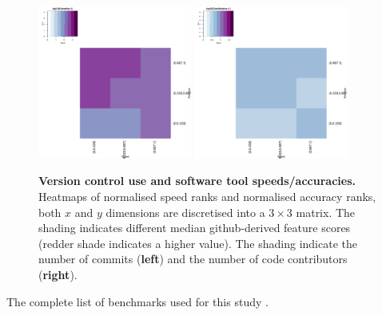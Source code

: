 \documentclass[fleqn,10pt]{SelfArx} %
\begin{document}
\begin{figure}[H]
\centering
\includegraphics[width=0.45\textwidth]{commits-SpeedVsAccuracy-heatmap.pdf}
\includegraphics[width=0.45\textwidth]{contributors-SpeedVsAccuracy-heatmap.pdf}
\caption{{\bf Version control use and software tool speeds/accuracies.}
  Heatmaps of normalised speed ranks and normalised accuracy
  ranks, both $x$ and $y$ dimensions are discretised into a $3 \times
  3$ matrix. The shading indicates different median github-derived
  feature scores (redder shade indicates a higher value).  The shading
  indicate the number of commits ({\bf left}) and the number of code contributors
  ({\bf right}).
 }
\label{fig:heatmapsCommits}
\end{figure}

The complete list of benchmarks used for this study
\cite{pmid32183840,
pmid32138645,
pmid31948481,
pmid31874603,
pmid31984131,
pmid31639029,
pmid31465436,
pmid31324872,
pmid31159850,
pmid31136576,
pmid31080946,
pmid31015787,
pmid30936559,
pmid30717772,
pmid30658573,
pmid29568413,
pmid28934964,
pmid28808243,
pmid28739658,
pmid28569140,
pmid28052134,
pmid27256311,
pmid26862001,
pmid26778510,
pmid26628557,
pmid26220471,
pmid25777524,
pmid25760244,
pmid25574120,
pmid25521762,
pmid25511303,
pmid25198770,
pmid24839440,
pmid24708189,
pmid24602402,
pmid24526711,
pmid24086547,
pmid23842808,
pmid23758764,
pmid23593445,
pmid23393030,
pmid22574964,
pmid22506536,
pmid22492192,
pmid22287634,
pmid22152123,
pmid22172045,
pmid22132132,
pmid21856737,
pmid21615913,
pmid21525877,
pmid21483869,
pmid21423806,
pmid21113338,
pmid20617200,
pmid20047664,
pmid19179695,
pmid19126200,
pmid19046431,
pmid18793413,
pmid18287116,
pmid17151342,
pmid17062146,
pmid15840834,
pmid15701525,
ng2013estimating}.




\end{document}
